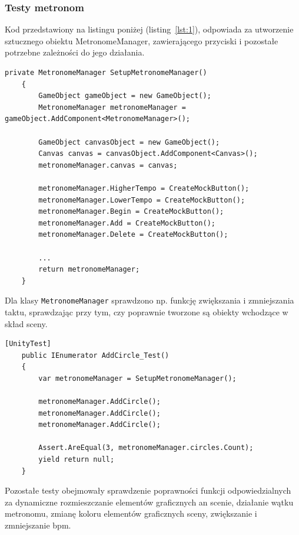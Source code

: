 \subsubsection{Testy metronom}

Kod przedstawiony na listingu poniżej (listing~\ref{lst:1}), odpowiada za utworzenie sztucznego obiektu MetronomeManager, zawierającego przyciski i pozostałe potrzebne zależności do jego działania. 

\begin{lstlisting}[style=sharpcstyle,caption=Funkcja \texttt{SetupMetronomeManager}, label=lst:1]
    private MetronomeManager SetupMetronomeManager()
    {
        GameObject gameObject = new GameObject();
        MetronomeManager metronomeManager = gameObject.AddComponent<MetronomeManager>();
        
        GameObject canvasObject = new GameObject();
        Canvas canvas = canvasObject.AddComponent<Canvas>();
        metronomeManager.canvas = canvas;

        metronomeManager.HigherTempo = CreateMockButton();
        metronomeManager.LowerTempo = CreateMockButton();
        metronomeManager.Begin = CreateMockButton();
        metronomeManager.Add = CreateMockButton();
        metronomeManager.Delete = CreateMockButton();

        ...
        return metronomeManager;
    }
\end{lstlisting}

Dla klasy \texttt{MetronomeManager} sprawdzono np. funkcję zwiększania i zmniejszania taktu, sprawdzając przy tym, czy poprawnie tworzone są obiekty wchodzące w skład sceny.

\begin{lstlisting}[style=sharpcstyle,caption=Funkcja \texttt{AddCircle\_Test}, label=lst:2]
    [UnityTest]
    public IEnumerator AddCircle_Test()
    {
        var metronomeManager = SetupMetronomeManager();
        
        metronomeManager.AddCircle();
        metronomeManager.AddCircle();
        metronomeManager.AddCircle();
        
        Assert.AreEqual(3, metronomeManager.circles.Count);
        yield return null;
    }
\end{lstlisting}

Pozostałe testy obejmowały sprawdzenie poprawności funkcji odpowiedzialnych za dynamiczne rozmieszczanie elementów graficznych an scenie, działanie wątku metronomu, zmianę koloru elementów graficznych sceny, zwiększanie i zmniejszanie bpm.

